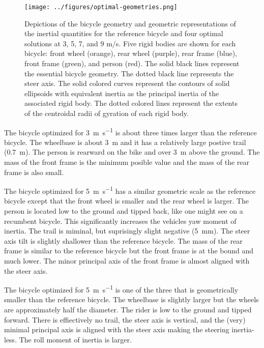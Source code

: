 \documentclass{bmd2019a}
\begin{document}
%
\begin{figure}
  \centering
  \texttt{[image: ../figures/optimal-geometries.png]}
  \label{fig:optimal-geometries}
  \caption{Depictions of the bicycle geometry and geometric representations of
    the inertial quantities for the reference bicycle and four optimal solutions
    at 3, 5, 7, and 9 m/s. Five rigid bodies are shown for each bicycle: front
    wheel (orange), rear wheel (purple), rear frame (blue), front frame
    (green), and person (red). The solid black lines represent the essential
    bicycle geometry. The dotted black line represents the steer axis. The
    solid colored curves represent the contours of solid ellipsoids with
    equivalent inertia as the principal inertia of the associated rigid body.
    The dotted colored lines represent the extents of the centroidal radii of
    gyration of each rigid body.}
\end{figure}

The bicycle optimized for 3~\si{\meter\per\second} is about three times larger
than the reference bicycle. The wheelbase is about 3~\si{\meter} and it has a
relatively large postive trail (0.7~\si{\meter}). The person is rearward on the
bike and over 3~\si{\meter} above the ground. The mass of the front frame is
the minimum posible value and the mass of the rear frame is also small.

The bicycle optimized for 5~\si{\meter\per\second} has a similar geometric
scale as the reference bicycle except that the front wheel is smaller and the
rear wheel is larger. The person is located low to the ground and tipped back,
like one might see on a recumbent bicycle.  This significantly increases the
vehicles yaw moment of inertia. The trail is miminal, but suprisingly slight
negative (5~\si{\milli\meter}). The steer axis tilt is slightly shallower than
the reference bicycle. The mass of the rear frame is similar to the reference
bicycle but the front frame is at the bound and much lower. The minor principal
axis of the front frame is almost aligned with the steer axis.

The bicycle optimized for 5~\si{\meter\per\second} is one of the three that is
geometrically smaller than the reference bicycle. The wheelbase is slightly
larger but the wheels are approximately half the diameter. The rider is low to
the ground and tipped forward. There is effiectively no trail, the steer axis
is vertical, and the (very) minimal principal axis is aligned with the steer
axis making the steering inertia-less. The roll moment of inertia is larger.
\end{document}
